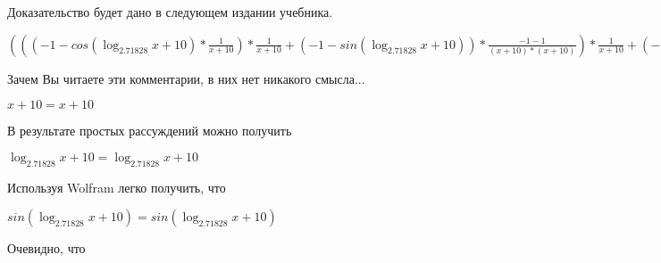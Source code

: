 \documentclass[12pt,a4paper,fleqn]{article}
\theoremstyle{definition}
\begin{document}
Доказательство будет дано в следующем издании учебника.

$((( -1  - cos(\log_{ 2.71828 }{ x  +  10 }) * \frac{ 1 }{ x  +  10 }
) * \frac{ 1 }{ x  +  10 }
 + ( -1  - sin(\log_{ 2.71828 }{ x  +  10 })) * \frac{ -1  -  1 }{( x  +  10 ) * ( x  +  10 )}
) * \frac{ 1 }{ x  +  10 }
 + ( -1  - sin(\log_{ 2.71828 }{ x  +  10 })) * \frac{ 1 }{ x  +  10 }
 * \frac{ -1  -  1 }{( x  +  10 ) * ( x  +  10 )}
 + ( -1  - sin(\log_{ 2.71828 }{ x  +  10 })) * \frac{ 1 }{ x  +  10 }
 * \frac{ -2 }{( x  +  10 ) * ( x  +  10 )}
 + cos(\log_{ 2.71828 }{ x  +  10 }) * \frac{ -1  -  -2  * ( x  +  10  +  x  +  10 )}{( x  +  10 ) * ( x  +  10 ) * ( x  +  10 ) * ( x  +  10 )}
) * { 3 }^{sin(\log_{ 2.71828 }{ x  +  10 })} + (( -1  - sin(\log_{ 2.71828 }{ x  +  10 })) * \frac{ 1 }{ x  +  10 }
 * \frac{ 1 }{ x  +  10 }
 + cos(\log_{ 2.71828 }{ x  +  10 }) * \frac{ -2 }{( x  +  10 ) * ( x  +  10 )}
) * cos(\log_{ 2.71828 }{ x  +  10 }) * \frac{ 1 }{ x  +  10 }
 * { 3 }^{sin(\log_{ 2.71828 }{ x  +  10 })} = ((( -1  - cos(\log_{ 2.71828 }{ x  +  10 }) * \frac{ 1 }{ x  +  10 }
) * \frac{ 1 }{ x  +  10 }
 + ( -1  - sin(\log_{ 2.71828 }{ x  +  10 })) * \frac{ -1  -  1 }{( x  +  10 ) * ( x  +  10 )}
) * \frac{ 1 }{ x  +  10 }
 + ( -1  - sin(\log_{ 2.71828 }{ x  +  10 })) * \frac{ 1 }{ x  +  10 }
 * \frac{ -1  -  1 }{( x  +  10 ) * ( x  +  10 )}
 + ( -1  - sin(\log_{ 2.71828 }{ x  +  10 })) * \frac{ 1 }{ x  +  10 }
 * \frac{ -2 }{( x  +  10 ) * ( x  +  10 )}
 + cos(\log_{ 2.71828 }{ x  +  10 }) * \frac{ -1  -  -2  * ( x  +  10  +  x  +  10 )}{( x  +  10 ) * ( x  +  10 ) * ( x  +  10 ) * ( x  +  10 )}
) * { 3 }^{sin(\log_{ 2.71828 }{ x  +  10 })} + (( -1  - sin(\log_{ 2.71828 }{ x  +  10 })) * \frac{ 1 }{ x  +  10 }
 * \frac{ 1 }{ x  +  10 }
 + cos(\log_{ 2.71828 }{ x  +  10 }) * \frac{ -2 }{( x  +  10 ) * ( x  +  10 )}
) * cos(\log_{ 2.71828 }{ x  +  10 }) * \frac{ 1 }{ x  +  10 }
 * { 3 }^{sin(\log_{ 2.71828 }{ x  +  10 })}$

Зачем Вы читаете эти комментарии, в них нет никакого смысла...

$ x  +  10  =  x  +  10 $

В результате простых рассуждений можно получить

$\log_{ 2.71828 }{ x  +  10 } = \log_{ 2.71828 }{ x  +  10 }$

Используя Wolfram легко получить, что

$sin(\log_{ 2.71828 }{ x  +  10 }) = sin(\log_{ 2.71828 }{ x  +  10 })$

Очевидно, что
\end{document}
